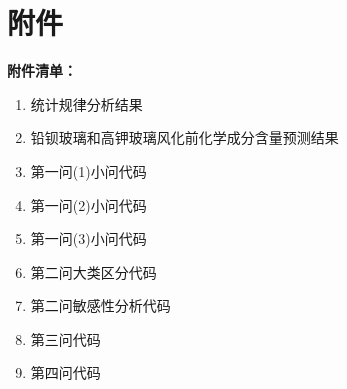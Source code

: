 \documentclass{my_paper}
\begin{document}
\section{附件}
\textbf{附件清单：}
\renewcommand\theenumi{\roman{enumi}}
\renewcommand\labelenumi{\textbf{附录\theenumi}}
\begin{enumerate}
  \item 统计规律分析结果
  \item 铅钡玻璃和高钾玻璃风化前化学成分含量预测结果
  \item 第一问(1)小问代码
  \item 第一问(2)小问代码
  \item 第一问(3)小问代码
 \item 第二问大类区分代码
 \item 第二问敏感性分析代码
   \item 第三问代码
 \item 第四问代码
\end{enumerate} 
\vspace{2em}
\end{document}
